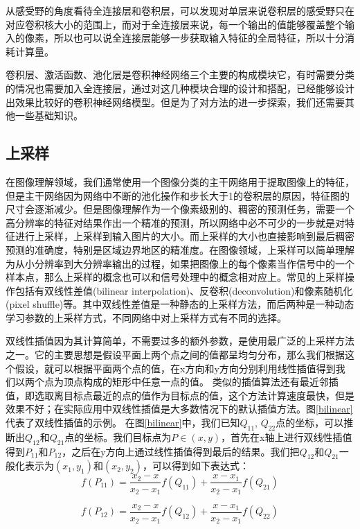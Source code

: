 \documentclass[master]{thesis-uestc}
\begin{document}
从感受野的角度看待全连接层和卷积层，可以发现对单层来说卷积层的感受野只在对应卷积核大小的范围上，而对于全连接层来说，每一个输出的值能够覆盖整个输入的像素，所以也可以说全连接层能够一步获取输入特征的全局特征，所以十分消耗计算量。

卷积层、激活函数、池化层是卷积神经网络三个主要的构成模块它，有时需要分类的情况也需要加入全连接层，通过对这几种模块合理的设计和搭配，已经能够设计出效果比较好的卷积神经网络模型。但是为了对方法的进一步探索，我们还需要其他一些基础知识。

\subsection{上采样}
在图像理解领域，我们通常使用一个图像分类的主干网络用于提取图像上的特征，但是主干网络因为网络中不断的池化操作和步长大于1的卷积层的原因，特征图的尺寸会逐渐减少。但是图像理解作为一个像素级别的、稠密的预测任务，需要一个高分辨率的特征对结果作出一个精准的预测，所以网络中必不可少的一步就是对特征进行上采样，上采样到输入图片的大小。而上采样的大小也直接影响到最后稠密预测的准确度，特别是区域边界地区的精准度。在图像领域，上采样可以简单理解为从小分辨率到大分辨率输出的过程，如果把图像上的每个像素当作信号中的一个样本点，那么上采样的概念也可以和信号处理中的概念相对应上。常见的上采样操作包括有双线性差值(bilinear interpolation)、反卷积(deconvolution)和像素随机化(pixel shuffle)等。其中双线性差值是一种静态的上采样方法，而后两种是一种动态学习参数的上采样方式，不同网络中对上采样方式有不同的选择。

双线性插值因为其计算简单，不需要过多的额外参数，是使用最广泛的上采样方法之一。它的主要思想是假设平面上两个点之间的值都呈均匀分布，那么我们根据这个假设，就可以根据平面两个点的值，在x方向和y方向分别利用线性插值得到我们以两个点为顶点构成的矩形中任意一点的值。 类似的插值算法还有最近邻插值，即选取离目标点最近的点的值作为目标点的值，这个方法计算速度最快，但是效果不好；在实际应用中双线性插值是大多数情况下的默认插值方法。图\ref{bilinear}代表了双线性插值的示例。  在图\ref{bilinear}中，我们已知$Q_{11}$, $Q_{22}$点的坐标，可以推断出$Q_{12}$和$Q_{21}$点的坐标。我们目标点为$P \in (x, y)$，首先在x轴上进行双线性插值得到$P_{11}$和$P_{12}$，之后在y方向上通过线性插值得到最后的结果。我们把$Q_{12}$和$Q_{21}$一般化表示为$(x_1, y_1)$和$(x_2, y_2)$，可以得到如下表达式：
\begin{equation}
    f(P_{11}) =  \frac{x_2 - x }{x_2 - x_1} f(Q_{11})  + \frac{x - x_1 }{x_2 - x_1} f(Q_{21}) 
\end{equation}

\begin{equation}
    f(P_{12}) =  \frac{x_2 - x }{x_2 - x_1} f(Q_{12})  + \frac{x - x_1 }{x_2 - x_1} f(Q_{22}) 
\end{equation}
\end{document}

